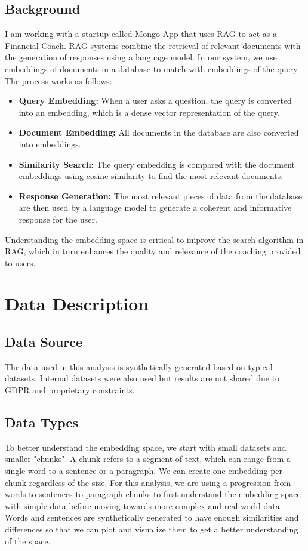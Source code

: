 \documentclass{scrartcl}
\begin{document}
\subsection{Background}
I am working with a startup called Mongo App that uses RAG to act as a Financial Coach. RAG systems combine the retrieval of relevant documents with the generation of responses using a language model. In our system, we use embeddings of documents in a database to match with embeddings of the query. The process works as follows:
\begin{itemize}
    \item \textbf{Query Embedding:} When a user asks a question, the query is converted into an embedding, which is a dense vector representation of the query.
    \item \textbf{Document Embedding:} All documents in the database are also converted into embeddings.
    \item \textbf{Similarity Search:} The query embedding is compared with the document embeddings using cosine similarity to find the most relevant documents.
    \item \textbf{Response Generation:} The most relevant pieces of data from the database are then used by a language model to generate a coherent and informative response for the user.
\end{itemize}
Understanding the embedding space is critical to improve the search algorithm in RAG, which in turn enhances the quality and relevance of the coaching provided to users.

\section{Data Description}
\subsection{Data Source}
The data used in this analysis is synthetically generated based on typical datasets. Internal datasets were also used but results are not shared due to GDPR and proprietary constraints.

\subsection{Data Types}
To better understand the embedding space, we start with small datasets and smaller "chunks". A chunk refers to a segment of text, which can range from a single word to a sentence or a paragraph. We can create one embedding per chunk regardless of the size. For this analysis, we are using a progression from words to sentences to paragraph chunks to first understand the embedding space with simple data before moving towards more complex and real-world data. Words and sentences are synthetically generated to have enough similarities and differences so that we can plot and visualize them to get a better understanding of the space.
\end{document}
